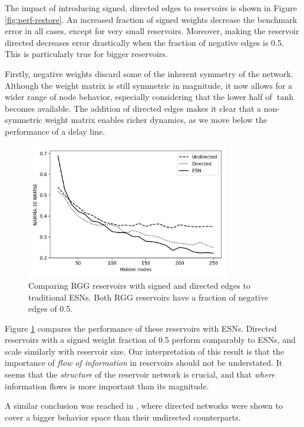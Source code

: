 The impact of introducing signed, directed edges to reservoirs is shown in
Figure \ref{fig:perf-restore}. An increased fraction of signed weights decrease
the benchmark error in all cases, except for very small reservoirs. Moreover,
making the reservoir directed decreases error drastically when the fraction of
negative edges is 0.5. This is particularly true for bigger reservoirs.

Firstly, negative weights discard some of the inherent symmetry of the
network. Although the weight matrix is still symmetric in magnitude, it now
allows for a wider range of node behavior, especially considering that the lower
half of $\tanh$ becomes available. The addition of directed edges makes it clear
that a non-symmetric weight matrix enables richer dynamics, as we move below the
performance of a delay line.

\begin{figure}[t]
  \centering
  \includegraphics[width=3.5in]{figures/perf-rest-comp.png}
  \caption{
    Comparing RGG reservoirs with signed and directed edges to traditional
ESNs. Both RGG reservoirs have a fraction of negative edges of 0.5.
  }
  \label{fig:perf-rest-comp}
\end{figure}

Figure \ref{fig:perf-rest-comp} compares the performance of these reservoirs
with ESNs. Directed reservoirs with a signed weight fraction of 0.5 perform
comparably to ESNs, and scale similarly with reservoir size. Our interpretation
of this result is that the importance of \textit{flow of information} in
reservoirs should not be understated. It seems that the \textit{structure} of
the reservoir network is crucial, and that \textit{where} information flows is
more important than its magnitude.

A similar conclusion was reached in \cite{mcquillan_role_2019}, where directed
networks were shown to cover a bigger behavior space than their undirected
counterparts.

